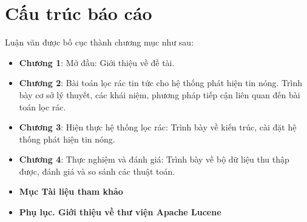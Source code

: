 \section{Cấu trúc báo cáo}
Luận văn được bố cục thành chương mục như sau:
\begin{itemize}
	\item \textbf{Chương 1}: Mở đầu: Giới thiệu về đề tài.
  \item \textbf{Chương 2}: Bài toán lọc rác tin tức cho hệ thống phát hiện tin nóng. Trình bày cơ sở lý thuyết, các khái niệm, phương pháp tiếp cận liên quan đến bài toán lọc rác.
	\item \textbf{Chương 3}: Hiện thực hệ thống lọc rác: Trình bày về kiến trúc, cài đặt hệ thống phát hiện tin nóng.
	\item \textbf{Chương 4}: Thực nghiệm và đánh giá: Trình bày về bộ dữ liệu thu thập được, đánh giá và so sánh các thuật toán.
	\item \textbf{Mục Tài liệu tham khảo}
	\item \textbf{Phụ lục. Giới thiệu về thư viện Apache Lucene}
\end{itemize}
